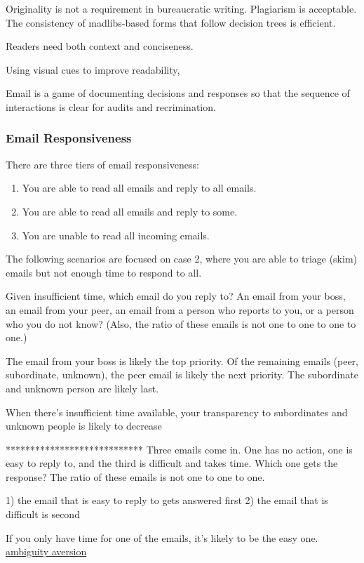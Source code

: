 Originality is not a requirement in bureaucratic writing. Plagiarism is acceptable. The consistency of madlibs-based forms that follow decision trees is efficient. 

Readers need both context and conciseness. 

Using visual cues to improve readability,

Email is a game of documenting decisions and responses so that the sequence of interactions is clear for audits and recrimination. 

\subsubsection{Email Responsiveness\label{sec:email-responsiveness}}

There are three tiers of email responsiveness:
\begin{enumerate}
    \item You are able to read all emails and reply to all emails.
    \item You are able to read all emails and reply to some.
    \item You are unable to read all incoming emails. 
\end{enumerate}
The following scenarios are focused on case 2, where you are able to triage (skim) emails but not enough time to respond to all.


Given insufficient time, which email do you reply to? An email from your boss, an email from your peer, an email from a person who reports to you, or a person who you do not know?
(Also, the ratio of these emails is not one to one to one to one.)

The email from your boss is likely the top priority. Of the remaining emails (peer, subordinate, unknown), the peer email is likely the next priority.
The subordinate and unknown person are likely last.

When there's insufficient time available, your transparency to subordinates and unknown people is likely to decrease

****************************
Three emails come in. One has no action, one is easy to reply to, and the third is difficult and takes time. Which one gets the response?
The ratio of these emails is not one to one to one.

1) the email that is easy to reply to gets answered first
2) the email that is difficult is second

If you only have time for one of the emails, it's likely to be the easy one. 
\href{https://en.wikipedia.org/wiki/Ambiguity_aversion}{ambiguity aversion}

